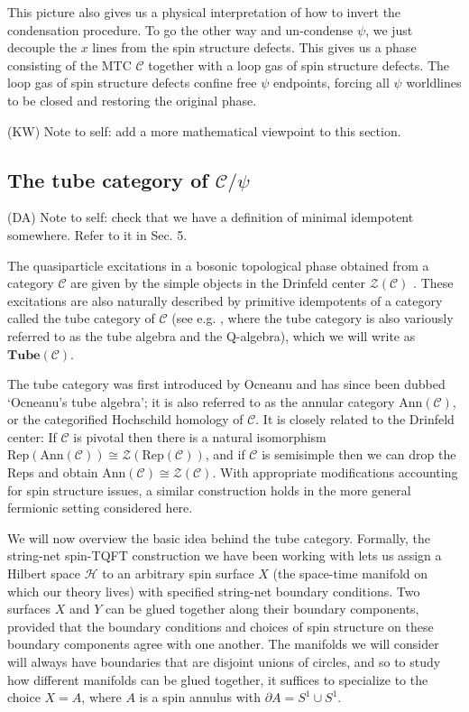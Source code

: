 \documentclass[12pt,a4paper]{article}
\newcommand{\mcz}{\mathcal{Z}}
\newcommand{\mch}{\mathcal{H}}
\newcommand{\mcc}{\mathcal{C}}
\newcommand{\p}{\partial}
\newcommand{\tube}{\textbf{Tube}}
\newcommand{\kw}[1]{{\color{kwcolor}\footnotesize{(KW) #1}}}
\newcommand{\dave}[1]{{\color{ao(english)}\footnotesize{(DA) #1}}}
\begin{document}
This picture also gives us a physical interpretation of how to invert the condensation 
procedure. 
To go the other way and un-condense $\psi$, we just decouple the $x$ lines from the spin structure defects.
This gives us a phase consisting of the MTC $\mcc$ together with a loop gas of spin structure defects.
The loop gas of spin structure defects confine free $\psi$ endpoints, forcing all $\psi$ 
worldlines to be closed and restoring the original phase. 

\kw{Note to self: add a more mathematical viewpoint to this section.}


\subsection{The tube category of $\mcc/\psi$}

\dave{Note to self: check that we have a definition of minimal idempotent somewhere.
Refer to it in Sec. 5.}

The quasiparticle excitations in a bosonic topological phase obtained from a category $\mcc$ 
are given by the simple objects in the Drinfeld center $\mcz(\mcc)$ \cite{levin2005}.
These excitations are also naturally described by primitive idempotents of a category called the tube category of $\mcc$ (see e.g. \cite{ocneanu2001,evans1995,Izumi2000,muger2003b,Bultinck2017,Lan2014, Hu2015}, 
where the tube category is also variously referred to as the tube algebra and the Q-algebra), 
which we will write as $\tube(\mcc)$.

The tube category was first introduced by Ocneanu \cite{ocneanu1994} and has since 
been dubbed `Ocneanu's tube algebra'; it is also referred to as the annular category $\text{Ann}(\mcc)$, 
or the categorified Hochschild homology of $\mcc$.
It is closely related to the Drinfeld center:
If $\mcc$ is pivotal then there is a natural isomorphism
$\text{Rep}(\text{Ann}(\mcc)) \cong \mcz(\text{Rep}(\mcc))$, and if $\mcc$ is semisimple then we can drop
the $\text{Rep}$s and obtain $\text{Ann}(\mcc) \cong \mcz(\mcc)$.
With appropriate modifications accounting for spin structure issues, a similar construction holds 
in the more general fermionic setting considered here. 




We will now overview the basic idea behind the tube category. 
Formally, the string-net spin-TQFT construction we have been working with lets us assign a Hilbert space $\mch$
to an arbitrary spin surface $X$ (the space-time manifold on which our theory lives) with specified string-net boundary conditions. 
Two surfaces $X$ and $Y$ can be glued together along their boundary components, provided that 
the boundary conditions and choices of spin structure on these boundary components agree with one another. 
The manifolds we will consider will always have boundaries that are disjoint unions of circles, and so to 
study how different manifolds can be glued together, it suffices to specialize to the choice $X = A$, 
where $A$ is a spin annulus with $\p A = S^1 \cup S^1$. 
\end{document}
